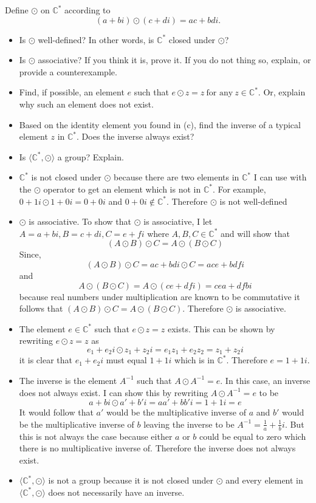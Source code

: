 \documentclass[titlepage]{article}
\newenvironment{problem}[2][Problem]{\begin{trivlist}
\item[\hskip \labelsep {\bfseries #1}\hskip \labelsep {\bfseries #2.}]}{\end{trivlist}}
\begin{document}
\begin{problem}{6}
Define $\odot$ on $\mathbb{C}^*$ according to
$$(a+bi) \odot (c+di) = ac + bdi.$$
\begin{itemize}
\item[(a)] Is $\odot$ well-defined? In other words, is $\mathbb{C}^*$ closed under $\odot$?
\item[(b)] Is $\odot$ associative? If you think it is, prove it. If you do not thing so, explain, or provide a counterexample.
\item[(c)] Find, if possible, an element $e$ such that $e\odot z =z \ \text{for any} \ z \in \mathbb{C}^*.$ Or, explain why such an element does not exist. 
\item[(d)] Based on the identity element you found in (c), find the inverse of a typical element $z$  in $\mathbb{C}^*$. Does the inverse always exist?
\item[(e)] Is $\langle \mathbb{C}^*,\odot\rangle$ a group? Explain.
\end{itemize}
\hrulefill 
\begin{itemize}
	
	\item[(a)] $\mathbb{C}^*$ is not closed under $\odot$ because there are two elements in $\mathbb{C}^*$ I can use with the $\odot$ operator to get an element which is not in $\mathbb{C}^*$. For example, $0+1i\odot 1+0i = 0+0i$ and $0+0i \notin \mathbb{C}^*$. Therefore $\odot$ is not well-defined
	\item[(b)] $\odot$ is associative. To show that $\odot$ is associative, I let $A=a+bi, B=c+di, C=e+fi $ where $A,B,C \in \mathbb{C}^*$ and will show that 
		$$(A\odot B)\odot C = A\odot(B\odot C)$$
		Since,
		$$(A\odot B)\odot C = ac + bdi \odot C = ace + bdfi$$
		and
		$$ A\odot(B\odot C) = A \odot (ce + dfi) = cea + dfbi$$
		because real numbers under multiplication are known to be commutative it follows that $(A\odot B)\odot C = A\odot(B\odot C)$. Therefore $\odot$ is associative.
	\item[(c)] The element $e\in\mathbb{C}^*$ such that $e \odot z = z$ exists. This can be shown by rewriting $e\odot z =z $ as
		$$e_1 + e_2i \odot z_1 + z_2i = e_1z_1 + e_2z_2 = z_1 + z_2i$$
		it is clear that $e_1+e_2i$ must equal $1+1i$ which is in $\mathbb{C}^*$. Therefore $e = 1+1i$.
	\item[(d)] The inverse is the element $A^{-1}$ such that $A \odot A^{-1} = e$. In this case, an inverse does not always exist. I can show this by rewriting $A \odot A^{-1} = e$ to be 
		$$a+bi \odot a'+b'i = aa' + bb'i = 1 + 1i = e$$ It would follow that $a'$ would be the multiplicative inverse of $a$ and $b'$ would be the multiplicative inverse of $b$ leaving the inverse to be $A^{-1} = \frac{1}{a} + \frac{1}{b}i$. But this is not always the case because either $a$ or $b$ could be equal to zero which there is no multiplicative inverse of. Therefore the inverse does not always exist.
	\item[(e)]  $\langle \mathbb{C}^*, \odot\rangle$ is not a group because it is not closed under $\odot$ and every element in $\langle \mathbb{C}^*,\odot\rangle$ does not necessarily have an inverse.
\end{itemize}
\end{problem}
\end{document}
